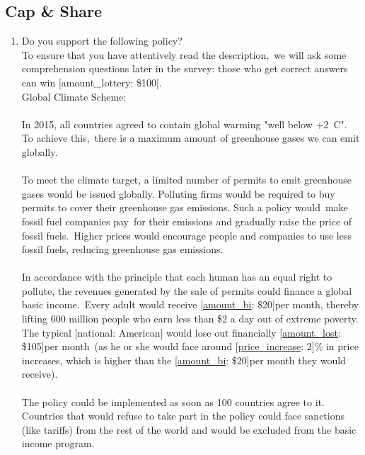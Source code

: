  \subsection*{Cap \& Share} 
 \begin{enumerate}[resume] 
\item  \label{q:gcs_support} Do you support the following policy?\\
To ensure that you have attentively read the description,~we will ask some comprehension questions later in the survey: those who get correct answers can win [amount\_lottery: \$100].
~\\
Global Climate Scheme:~\\\\
In 2015, all countries agreed to contain global warming "well below +2~\textdegree{}C". To achieve this,~there is a maximum amount of greenhouse gases we can emit globally.~\\\\
To meet the climate target, a limited number of permits to emit greenhouse gases would be issued globally. Polluting firms would be required to buy permits to cover their greenhouse gas emissions. Such a policy would~make fossil fuel companies pay~for their emissions and gradually raise the price of fossil fuels.~Higher prices would encourage people and companies to use less fossil fuels, reducing greenhouse gas emissions.\\\\
In accordance with the principle that each human has an equal right to pollute, the revenues generated by the sale of permits could finance a global basic income.~Every adult would receive [\hyperlink{tab_features}{amount\_bi}: \$20]per month, thereby lifting 600 million people who earn less than \$2 a day out of extreme poverty.\\
The typical [national: American] would lose out financially [\hyperlink{tab_features}{amount\_lost}: \$105]per month~(as he or she would face around [\hyperlink{tab_features}{price\_increase}: 2]\% in price increases, which is higher than the [\hyperlink{tab_features}{amount\_bi}: \$20]per month they would receive).\\\\
The policy could be implemented as soon as 100 countries agree to it. Countries that would refuse to take part in the policy could face sanctions (like tariffs) from the rest of the world and would be excluded from the basic income program.\\\\

\end{enumerate}

